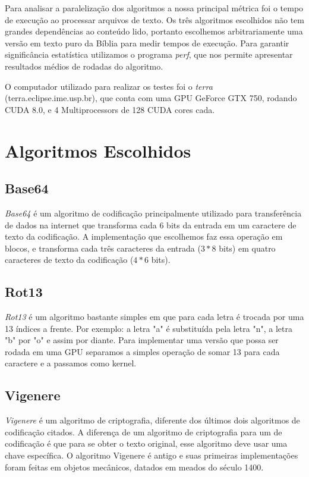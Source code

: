 \documentclass[12pt]{article}
\begin{document}
Para analisar a paralelização dos algoritmos a nossa principal métrica
foi o tempo de execução ao processar arquivos de texto. Os três 
algoritmos escolhidos não tem grandes dependências ao conteúdo lido, 
portanto escolhemos arbitrariamente uma versão em texto puro da Bíblia
para medir tempos de execução. Para garantir significância estatística
utilizamos o programa \emph{perf}, que nos permite apresentar resultados
médios de rodadas do algoritmo.

O computador utilizado para realizar os testes foi o \emph{terra} 
(terra.eclipse.ime.usp.br), que conta com uma GPU GeForce GTX 750,
rodando CUDA 8.0, e 4 Multiprocessors de 128 CUDA cores cada. 


\newpage
\section{Algoritmos Escolhidos}
\subsection{Base64}
\emph{Base64} é um algoritmo de codificação principalmente utilizado 
para transferência de dados na internet que transforma cada 6 bits 
da entrada em um caractere de texto da codificação. A implementação que 
escolhemos faz essa operação em blocos, e transforma cada três
caracteres da entrada ($3 * 8$ bits) em quatro caracteres de texto da
codificação ($4 * 6$ bits).

\subsection{Rot13}
\emph{Rot13} é um algoritmo bastante simples em que para cada letra é
trocada por uma 13 índices a frente. Por exemplo: a letra "a" é
substituída pela letra "n", a letra "b" por "o" e assim por diante.
Para implementar uma versão que possa ser rodada em uma GPU separamos
a simples operação de somar 13 para cada caractere e a passamos como
kernel. 

\subsection{Vigenere}
\emph{Vigenere} é um algoritmo de criptografia, diferente dos últimos 
dois algoritmos de codificação citados. A diferença de um algoritmo de
criptografia para um de codificação é que para se obter o texto 
original, esse algoritmo deve usar uma chave específica. O algoritmo
Vigenere é antigo e suas primeiras implementações foram feitas em 
objetos mecânicos, datados em meados do século 1400.
\end{document}

